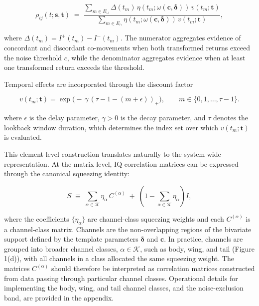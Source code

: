 \documentclass[12pt,letterpaper]{article}
\begin{document}
\begin{equation}
\rho_{ij}(t; \mathbf{s},\mathbf{t}) \;=\;
\frac{
\sum_{m \in E_\cup} \Delta(t_m)\, \eta(t_m; \omega(\mathbf{c}, \boldsymbol{\delta}))\, v(t_m;\mathbf{t})
}{
\sum_{m \in E_\cap} \eta(t_m; \omega(\mathbf{c}, \boldsymbol{\delta}))\, v(t_m;\mathbf{t})
},
\label{eq:rho-ij}
\end{equation}


where $\Delta(t_m) = I^+(t_m) - I^-(t_m)$. The numerator aggregates evidence of concordant and discordant co-movements when both transformed returns exceed the noise threshold $c$, while the denominator aggregates evidence when at least one transformed return exceeds the threshold.  

Temporal effects are incorporated through the discount factor  

\[v(t_m;\mathbf{t}) = \exp\!\Big(-\,\gamma\,(\tau-1-(m+\epsilon))_+\Big),
\qquad m\in\{0,1,\dots,\tau-1\}.\]


where $\epsilon$ is the delay parameter, $\gamma>0$ is the decay parameter, and $\tau$ denotes the lookback window duration, which determines the index set over which $v(t_m;\mathbf{t})$ is evaluated.
 

This element-level construction translates naturally to the system-wide representation. At the matrix level, IQ correlation matrices can be expressed through the canonical squeezing identity:

\begin{equation}
S \;\equiv\; \sum_{\alpha \in \mathcal{K}} \eta_\alpha \, C^{(\alpha)}
\;+\;
\left( 1 - \sum_{\alpha \in \mathcal{K}} \eta_\alpha \right) I,
\label{eq:canonical-squeezing}
\end{equation}

where the coefficients $\{\eta_\alpha\}$ are channel-class squeezing weights and each $C^{(\alpha)}$ is a channel-class matrix. Channels are the non-overlapping regions of the bivariate support defined by the template parameters $\boldsymbol{\delta}$ and $\mathbf{c}$. In practice, channels are grouped into broader channel classes, $\alpha \in \mathcal{K}$, such as body, wing, and tail (Figure 1(d)), with all channels in a class allocated the same squeezing weight. The matrices $C^{(\alpha)}$ should therefore be interpreted as correlation matrices constructed from data passing through particular channel classes. Operational details for implementing the body, wing, and tail channel classes, and the noise-exclusion band, are provided in the appendix.
 
\end{document}
